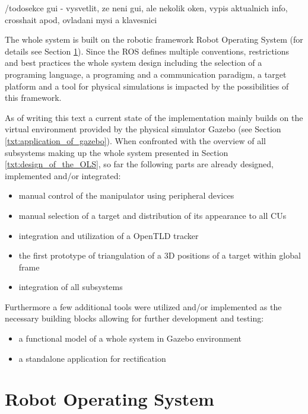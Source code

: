 /todo{sekce gui - vysvetlit, ze neni gui, ale nekolik oken, vypis aktualnich info, crosshait apod, ovladani mysi a klavesnici}

The whole system is built on the robotic framework Robot Operating System (for details see Section \ref{txt:robot_operating_system}). Since the ROS defines multiple conventions, restrictions and best practices the whole system design including the selection of a programing language, a programing and a communication paradigm, a target platform and a tool for physical simulations is impacted by the possibilities of this framework.

As of writing this text a current state of the implementation mainly builds on the virtual environment provided by the physical simulator Gazebo (see Section \ref{txt:application_of_gazebo}). When confronted with the overview of all subsystems making up the whole system presented in Section \ref{txt:design_of_the_OLS}, so far the following parts are already designed, implemented and/or integrated:

\begin{itemize}
	\item manual control of the manipulator using peripheral devices
	\item manual selection of a target and distribution of its appearance to all CUs
	\item integration and utilization of a OpenTLD tracker
	\item the first prototype of triangulation of a 3D positions of a target within global frame
	\item integration of all subsystems
\end{itemize}

Furthermore a few additional tools were utilized and/or implemented as the necessary building blocks allowing for further development and testing:

\begin{itemize}
	\item a functional model of a whole system in Gazebo environment
	\item a standalone application for rectification
\end{itemize}


\section{Robot Operating System} \label{txt:robot_operating_system}

